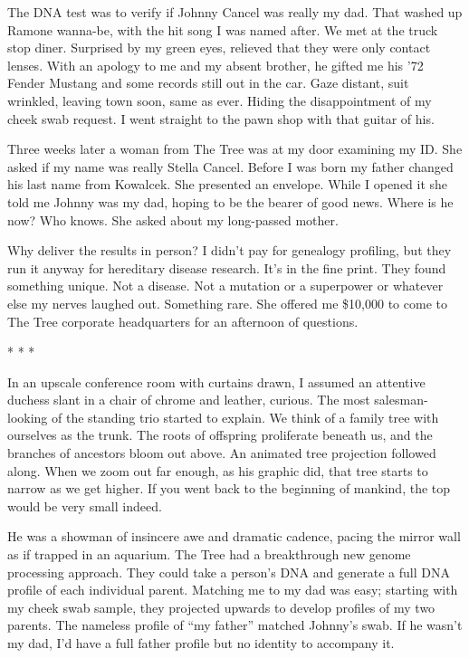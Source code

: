 
The DNA test was to verify if Johnny Cancel was really my dad. That
washed up Ramone wanna-be, with the hit song I was named after. We met
at the truck stop diner. Surprised by my green eyes, relieved that they
were only contact lenses. With an apology to me and my absent brother,
he gifted me his '72 Fender Mustang and some records still out in the
car. Gaze distant, suit wrinkled, leaving town soon, same as ever.
Hiding the disappointment of my cheek swab request. I went straight to
the pawn shop with that guitar of his.

Three weeks later a woman from The Tree was at my door examining my ID.
She asked if my name was really Stella Cancel. Before I was born my
father changed his last name from Kowalcek. She presented an envelope.
While I opened it she told me Johnny was my dad, hoping to be the bearer
of good news. Where is he now? Who knows. She asked about my long-passed
mother.

Why deliver the results in person? I didn't pay for genealogy profiling,
but they run it anyway for hereditary disease research. It's in the fine
print. They found something unique. Not a disease. Not a mutation or a
superpower or whatever else my nerves laughed out. Something rare. She
offered me \$10,000 to come to The Tree corporate headquarters for an
afternoon of questions.

* * *

In an upscale conference room with curtains drawn, I assumed an
attentive duchess slant in a chair of chrome and leather, curious. The
most salesman-looking of the standing trio started to explain. We think
of a family tree with ourselves as the trunk. The roots of offspring
proliferate beneath us, and the branches of ancestors bloom out above.
An animated tree projection followed along. When we zoom out far enough,
as his graphic did, that tree starts to narrow as we get higher. If you
went back to the beginning of mankind, the top would be very small
indeed.

He was a showman of insincere awe and dramatic cadence, pacing the
mirror wall as if trapped in an aquarium. The Tree had a breakthrough
new genome processing approach. They could take a person's DNA and
generate a full DNA profile of each individual parent. Matching me to my
dad was easy; starting with my cheek swab sample, they projected upwards
to develop profiles of my two parents. The nameless profile of ``my
father'' matched Johnny's swab. If he wasn't my dad, I'd have a full
father profile but no identity to accompany it.

